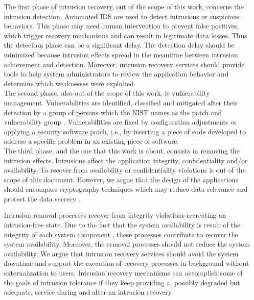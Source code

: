 The first phase of intrusion recovery, out of the scope of this work, concerns the intrusion detection. Automated \ac{IDS} are used to detect intrusions or suspicious behaviors. This phase may need human intervention to prevent false positives, which trigger recovery mechanisms and can result in legitimate data losses. Thus the detection phase can be a significant delay. The detection delay should be minimized because intrusion effects spread in the meantime between intrusion achievement and detection. Moreover, intrusion recovery services should provide tools to help system administrators to review the application behavior and determine which weaknesses were exploited. \\

The second phase, also out of the scope of this work, is vulnerability management. Vulnerabilities are identified, classified and mitigated after their detection by a group of persons which the \acf{NIST} names as the patch and vulnerability group \cite{Mell2005}. Vulnerabilities are fixed by configuration adjustments or applying a security software patch, i.e., by inserting a piece of code developed to address a specific problem in an existing piece of software. \\

The third phase, and the one that this work is about, consists in removing the intrusion effects. Intrusions affect the application integrity, confidentiality and/or availability. To recover from availability or confidentiality violations is out of the scope of this document. However, we argue that the design of the applications should encompass cryptography techniques which may reduce data relevance and protect the data secrecy \cite{Maheshwari2000}.

Intrusion removal processes recover from integrity violations recreating an intrusion-free state. Due to the fact that the system availability is result of the integrity of each system component \cite{Wang2007}, these processes contribute to recover the system availability. Moreover, the removal processes should not reduce the system availability. We argue that intrusion recovery services should avoid the system downtime and support the execution of recovery processes in background without externalization to users. Intrusion recovery mechanisms can accomplish some of the goals of intrusion tolerance if they keep providing a, possibly degraded but adequate, service during and after an intrusion recovery.

